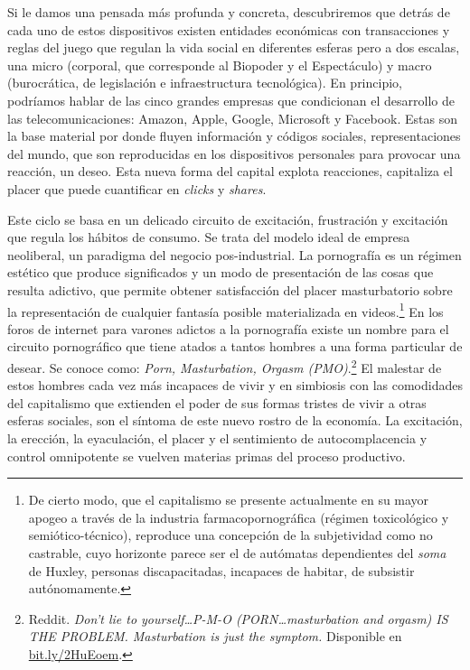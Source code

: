 Si le damos una pensada más profunda y concreta, descubriremos que detrás de cada uno de estos dispositivos existen entidades económicas con transacciones y reglas del juego que regulan la vida social en diferentes esferas pero a dos escalas, una micro (corporal, que corresponde al Biopoder y el Espectáculo) y macro (burocrática, de legislación e infraestructura tecnológica). En principio, podríamos hablar de las cinco grandes empresas que condicionan el desarrollo de las telecomunicaciones: Amazon, Apple, Google, Microsoft y Facebook. Estas son la base material por donde fluyen información y códigos sociales, representaciones del mundo, que son reproducidas en los dispositivos personales para provocar una reacción, un deseo. Esta nueva forma del capital explota reacciones, capitaliza el placer que puede cuantificar en \emph{clicks} y \emph{shares}.

Este ciclo se basa en un delicado circuito de excitación, frustración y excitación que regula los hábitos de consumo. Se trata del modelo ideal de empresa neoliberal, un paradigma del negocio pos-industrial. La pornografía es un régimen estético que produce significados y un modo de presentación de las cosas que resulta adictivo, que permite obtener satisfacción del placer masturbatorio sobre la representación de cualquier fantasía posible materializada en videos.\footnote{De cierto modo, que el capitalismo se presente actualmente en su mayor apogeo a través de la industria farmacopornográfica (régimen toxicológico y semiótico-técnico), reproduce una concepción de la subjetividad como no castrable, cuyo horizonte parece ser el de autómatas dependientes del \emph{soma} de Huxley, personas discapacitadas, incapaces de habitar, de subsistir autónomamente.} En los foros de internet para varones adictos a la pornografía existe un nombre para el circuito pornográfico que tiene atados a tantos hombres a una forma particular de desear. Se conoce como: \emph{Porn, Masturbation, Orgasm (PMO)}.\footnote{Reddit. \emph{Don't lie to yourself\ldots P-M-O (PORN\ldots masturbation and orgasm) IS THE PROBLEM. Masturbation is just the symptom.} Disponible en \url{bit.ly/2HuEoem}.} El malestar de estos hombres cada vez más incapaces de vivir y en simbiosis con las comodidades del capitalismo que extienden el poder de sus formas tristes de vivir a otras esferas sociales, son el síntoma de este nuevo rostro de la economía. La excitación, la erección, la eyaculación, el placer y el sentimiento de autocomplacencia y control omnipotente se vuelven materias primas del proceso productivo.

